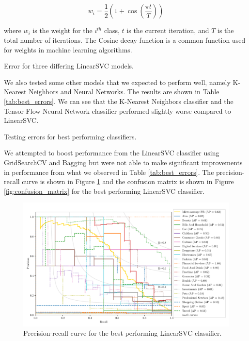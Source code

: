 \begin{equation}
    w_i = \frac{1}{2} \left(1 + \cos \left(\frac{\pi t}{T}\right)\right)
\label{eq:cosine_decay}
\end{equation}

where $w_i$ is the weight for the $i^{th}$ class, $t$ is the current iteration, and $T$ is the total number of iterations. The Cosine decay function is a common function used for weights in machine learning algorithms.


\begin{table}[!ht]
\centering
\caption{Error for three differing LinearSVC models.}

\label{tab:lsvc_errors}
\end{table}

We also tested some other models that we expected to perform well, namely K-Nearest Neighbors and Neural Networks. The results are shown in Table \ref{tab:best_errors}. We can see that the K-Nearest Neighbors classifier and the Tensor Flow Neural Network classifier performed slightly worse compared to LinearSVC.

\begin{table}[!ht]
\centering
\caption{Testing errors for best performing classifiers.}

\label{tab:best_errors}
\end{table}

We attempted to boost performance from the LinearSVC classifier using GridSearchCV and Bagging but were not able to make significant improvements in performance from what we observed in Table \ref{tab:best_errors}. The precision-recall curve is shown in Figure \ref{fig:pr_curve} and the confusion matrix is shown in Figure \ref{fig:confusion_matrix} for the best performing LinearSVC classifier.

\begin{figure}[ht]
  \centering
  \includegraphics[width=\textwidth]{../img/plot_pr_curve.pdf}
  \caption{Precision-recall curve for the best performing LinearSVC classifier.}
  \label{fig:pr_curve}
\end{figure}


